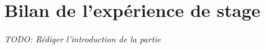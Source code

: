 \newpage
\section{Bilan de l'expérience de stage}
\emph{TODO: Rédiger l'introduction de la partie}



